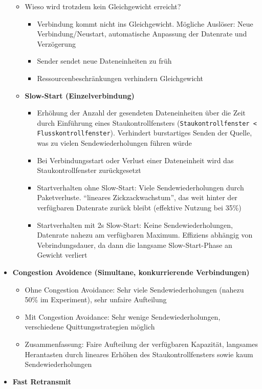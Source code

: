 \begin{itemize}
\begin{itemize}
		\item Wieso wird trotzdem kein Gleichgewicht erreicht?
		\begin{itemize}
			\item Verbindung kommt nicht ins Gleichgewicht. Mögliche Auslöser: Neue Verbindung/Neustart, automatische Anpassung der Datenrate und Verzögerung
			\item Sender sendet neue Dateneinheiten zu früh
			\item Ressourcenbeschränkungen verhindern Gleichgewicht
		\end{itemize}
	\item \textbf{Slow-Start (Einzelverbindung)}
	\begin{itemize}
		\item Erhöhung der Anzahl der gesendeten Dateneinheiten über die Zeit durch Einführung eines Staukontrollfensters (\texttt{Staukontrollfenster < Flusskontrollfenster}). Verhindert burstartiges Senden der Quelle, was zu vielen Sendewiederholungen führen würde
		\item Bei Verbindungsstart oder Verlust einer Dateneinheit wird das Staukontrollfenster zurückgesetzt
		\item Startverhalten ohne Slow-Start: Viele Sendewiederholungen durch Paketverluste. "`lineares Zickzackwachstum"', das weit hinter der verfügbaren Datenrate zurück bleibt (effektive Nutzung bei 35\%)
		\item Startverhalten mit 2s Slow-Start: Keine Sendewiederholungen, Datenrate nahezu am verfügbaren Maximum. Effiziens abhängig von Vebrindungsdauer, da dann die langsame Slow-Start-Phase an Gewicht verliert
		\end{itemize}
	\end{itemize}
	\item \textbf{Congestion Avoidence (Simultane, konkurrierende Verbindungen)}
	\begin{itemize}
		\item Ohne Congestion Avoidance: Sehr viele Sendewiederholungen (nahezu 50\% im Experiment), sehr unfaire Aufteilung
		\item Mit Congestion Avoidance: Sehr wenige Sendewiederholungen, verschiedene Quittungsstrategien möglich
		\item Zusammenfassung: Faire Aufteilung der verfügbaren Kapazität, langsames Herantasten durch lineares Erhöhen des Staukontrollfensters sowie kaum Sendewiederholungen
	\end{itemize}
	\item \textbf{Fast Retransmit}

\end{itemize}
